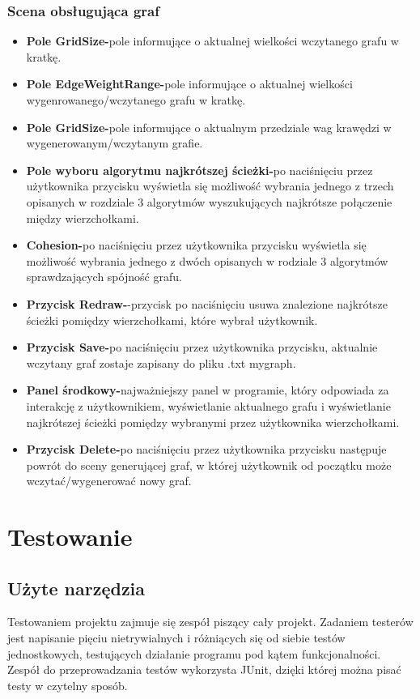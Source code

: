 \documentclass[10pt]{article}
\begin{document}
\subsubsection{Scena obsługująca graf}
\begin{itemize}
    \item \textbf{Pole GridSize-}pole informujące o aktualnej wielkości wczytanego grafu w kratkę.
    \item \textbf{Pole EdgeWeightRange-}pole informujące o aktualnej wielkości wygenrowanego/wczytanego grafu w kratkę.
    \item \textbf{Pole GridSize-}pole informujące o aktualnym przedziale wag krawędzi w wygenerowanym/wczytanym grafie.
    \item \textbf{Pole wyboru algorytmu najkrótszej ścieżki-}po naciśnięciu przez użytkownika przycisku wyświetla się możliwość wybrania jednego z trzech opisanych w rozdziale 3 algorytmów wyszukujących najkrótsze połączenie między wierzchołkami.
    \item \textbf{Cohesion-}po naciśnięciu przez użytkownika przycisku wyświetla się możliwość wybrania jednego z dwóch opisanych w rodziale 3 algorytmów sprawdzających spójność grafu.
    \item \textbf{Przycisk Redraw-}-przycisk po naciśnięciu usuwa znalezione najkrótsze ścieżki pomiędzy wierzchołkami, które wybrał użytkownik.
    \item \textbf{Przycisk Save-}po naciśnięciu przez użytkownika przycisku, aktualnie wczytany graf zostaje zapisany do pliku .txt mygraph.
    \item \textbf{Panel środkowy-}najważniejszy panel w programie, który odpowiada za interakcję z użytkownikiem, wyświetlanie aktualnego grafu i wyświetlanie najkrótszej ścieżki pomiędzy wybranymi przez użytkownika wierzchołkami.
    \item \textbf{Przycisk Delete-}po naciśnięciu przez użytkownika przycisku następuje powrót do sceny generującej graf, w której użytkownik od początku może wczytać/wygenerować nowy graf.
\end{itemize}
\section{Testowanie}
\subsection{Użyte narzędzia}
Testowaniem projektu zajmuje się zespół piszący cały projekt. Zadaniem testerów jest napisanie pięciu nietrywialnych i różniących się od siebie testów jednostkowych, testujących działanie programu pod kątem funkcjonalności. Zespół do przeprowadzania testów wykorzysta JUnit, dzięki której można pisać testy w czytelny sposób.
\end{document}
